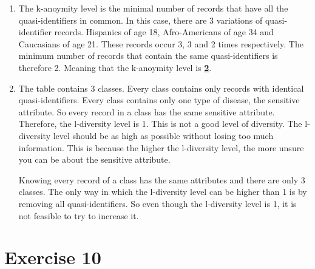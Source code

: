 \documentclass[twoside, a4paper, fleqn, reqno]{article}
\begin{document}
\begin{enumerate}
	\item The k-anoymity level is the minimal number of records that have all the quasi-identifiers in common.
	In this case, there are 3 variations of quasi-identifier records. Hispanics of age 18,
	Afro-Americans of age 34 and Caucasians of age 21.
	These records occur 3, 3 and 2 times respectively. The minimum
	number of records that contain the same quasi-identifiers is therefore 2. Meaning that the k-anoymity level
	is \textbf{\underline{2}}.\\
	\item The table contains 3 classes. Every class contains only records with identical quasi-identifiers.
	Every class contains only one type of disease, the sensitive attribute. So every record
	in a class has the same sensitive attribute. Therefore, the l-diversity level is 1.
	This is not a good level of diversity. The l-diversity level should be as high as possible without
	losing too much information. This is because the higher the l-diversity level, the more unsure
	you can be about the sensitive attribute.

	Knowing every record of a class has the same attributes and there are only 3 classes.
	The only way in which the l-diversity level can be higher than 1 is by removing all quasi-identifiers.
	So even though the l-diversity level is 1, it is not feasible to try to increase it.
	
\end{enumerate}

\section*{Exercise 10}
\end{document}

